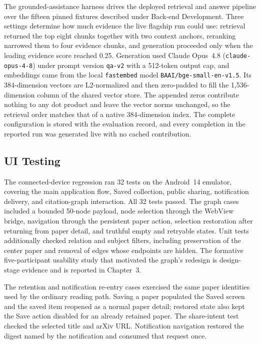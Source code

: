 The grounded-assistance harness drives the deployed retrieval and answer pipeline over the fifteen pinned fixtures described under Back-end Development.
Three settings determine how much evidence the live flagship run could use: retrieval returned the top eight chunks together with two context anchors, reranking narrowed them to four evidence chunks, and generation proceeded only when the leading evidence score reached 0.25.
Generation used Claude Opus~4.8 (\nolinkurl{claude-opus-4-8}) under prompt version \texttt{qa-v2} with a 512-token output cap, and embeddings came from the local \texttt{fastembed} model \nolinkurl{BAAI/bge-small-en-v1.5}.
Its 384-dimension vectors are L2-normalized and then zero-padded to fill the 1{,}536-dimension column of the shared vector store. The appended zeros contribute nothing to any dot product and leave the vector norms unchanged, so the retrieval order matches that of a native 384-dimension index.
The complete configuration is stored with the evaluation record, and every completion in the reported run was generated live with no cached contribution.

\subsection{UI Testing}

The connected-device regression ran 32 tests on the Android~14
emulator, covering the main application flow, Saved collection, public sharing,
notification delivery, and citation-graph interaction. All
32 tests passed. The graph cases included a bounded 50-node payload, node
selection through the WebView bridge, navigation through the persistent paper
action, selection restoration after returning from paper detail, and truthful
empty and retryable states. Unit tests additionally checked relation and subject
filters, including preservation of the center paper and removal of edges whose
endpoints are hidden.
The formative five-participant usability study that motivated the graph's redesign is design-stage evidence and is reported in Chapter~3.

The retention and notification re-entry cases exercised the same paper identities used
by the ordinary reading path. Saving a paper populated the Saved screen and the
saved item reopened as a normal paper detail; restored state also kept the Save
action disabled for an already retained paper. The share-intent test checked the
selected title and arXiv URL. Notification navigation restored the digest named
by the notification and consumed that request once.

